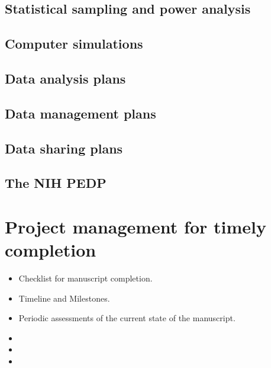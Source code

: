\documentclass[11pt,letterpaper]{article}
\begin{document}
\subsection{Statistical sampling and power analysis}
\label{sec:org3857b61}



\subsection{Computer simulations}
\label{sec:orgfae6842}


\subsection{Data analysis plans}
\label{sec:org63b4ae0}




\subsection{Data management plans}
\label{sec:org4c1c112}




\subsection{Data sharing plans}
\label{sec:orga16f971}




\subsection{The NIH PEDP}
\label{sec:org89f8021}


\section{Project management for timely completion}
\label{sec:orga87bf12}



\begin{itemize}
\item Checklist for manuscript completion.
\item Timeline and Milestones.
\item Periodic assessments of the current state of the manuscript.
\item 

\item 

\item 
\end{itemize}
\end{document}
